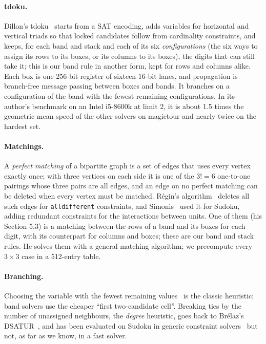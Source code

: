 \documentclass[11pt]{article}
\theoremstyle{definition}
\theoremstyle{plain}
\begin{document}
\paragraph{tdoku.} Dillon's tdoku~\cite{dillon2019tdoku,dillon2019nerdsniped} starts from a SAT encoding, adds
variables for horizontal and vertical triads so that locked candidates follow from cardinality constraints, and keeps,
for each band and stack and each of its six \emph{configurations} (the six ways to assign its rows to its boxes, or its
columns to its boxes), the digits that can still take it; this is our band rule in another form, kept for rows and
columns alike. Each box is one 256-bit register of sixteen 16-bit lanes, and propagation is branch-free message passing
between boxes and bands. It branches on a configuration of the band with the fewest remaining configurations. In its
author's benchmark on an Intel i5-8600k at limit 2, it is about 1.5 times the geometric mean speed of the other solvers
on magictour and nearly twice on the hardest set.

\paragraph{Matchings.} A \emph{perfect matching} of a bipartite graph is a set of edges that uses every vertex exactly
once; with three vertices on each side it is one of the $3!=6$ one-to-one pairings whose three pairs are all edges, and
an edge on no perfect matching can be deleted when every vertex must be matched. R\'egin's
algorithm~\cite{regin1994filtering} deletes all such edges for \texttt{alldifferent} constraints, and
Simonis~\cite{simonis2005sudoku} used it for Sudoku, adding redundant constraints for the interactions between units.
One of them (his Section 5.3) is a matching between the rows of a band and its boxes for each digit, with its
counterpart for columns and boxes; these are our band and stack rules. He solves them with a general matching
algorithm; we precompute every $3\times 3$ case in a 512-entry table.

\paragraph{Branching.} Choosing the variable with the fewest remaining values~\cite{haralick1980increasing} is the
classic heuristic; band solvers use the cheaper ``first two-candidate cell''. Breaking ties by the number of unassigned
neighbours, the \emph{degree} heuristic, goes back to Br\'elaz's DSATUR~\cite{brelaz1979new}, and has been evaluated on
Sudoku in generic constraint solvers~\cite{bakker2015generic,liu2026dibs} but not, as far as we know, in a fast solver.
\end{document}
